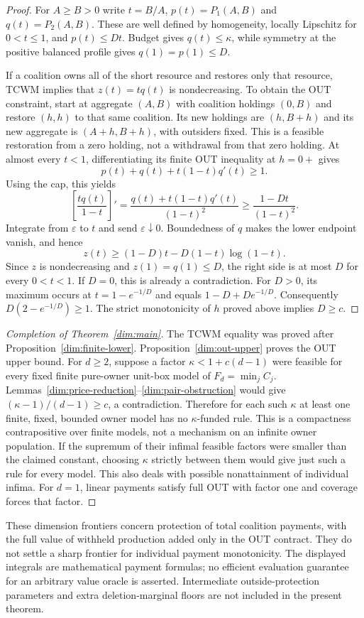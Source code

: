 \begin{proof}
For $A\ge B>0$ write $t=B/A$, $p(t)=P_1(A,B)$ and $q(t)=P_2(A,B)$.
These are well defined by homogeneity, locally Lipschitz for $0<t\le1$,
and $p(t)\le Dt$. Budget gives $q(t)\le\kappa$, while symmetry at the
positive balanced profile gives $q(1)=p(1)\le D$.

If a coalition owns all of the short resource and restores only that
resource, TCWM implies that $z(t)=tq(t)$ is nondecreasing. To obtain the
OUT constraint, start at aggregate $(A,B)$ with coalition holdings
$(0,B)$ and restore $(h,h)$ to that same coalition. Its new holdings are
$(h,B+h)$ and its new aggregate is $(A+h,B+h)$, with outsiders fixed.
This is a feasible restoration from a zero holding, not a withdrawal
from that zero holding. At almost every $t<1$, differentiating its finite
OUT inequality at $h=0+$ gives
\[
 p(t)+q(t)+t(1-t)q'(t)\ge1.
\]
Using the cap, this yields
\[
 \left[\frac{tq(t)}{1-t}\right]'
 =\frac{q(t)+t(1-t)q'(t)}{(1-t)^2}
 \ge\frac{1-Dt}{(1-t)^2}.
\]
Integrate from $\varepsilon$ to $t$ and send $\varepsilon\downarrow0$.
Boundedness of $q$ makes the lower endpoint vanish, and hence
\[
 z(t)\ge (1-D)t-D(1-t)\log(1-t).
\]
Since $z$ is nondecreasing and $z(1)=q(1)\le D$, the right side is at
most $D$ for every $0<t<1$. If $D=0$, this is already a contradiction.
For $D>0$, its maximum occurs at $t=1-e^{-1/D}$ and equals
$1-D+De^{-1/D}$. Consequently
$D(2-e^{-1/D})\ge1$. The strict monotonicity of $h$ proved above implies
$D\ge c$.
\end{proof}

\begin{proof}[Completion of Theorem~\ref{dim:main}]
The TCWM equality was proved after Proposition~\ref{dim:finite-lower}.
Proposition~\ref{dim:out-upper} proves the OUT upper bound.
For $d\ge2$, suppose a factor $\kappa<1+c(d-1)$ were feasible for
every fixed finite pure-owner unit-box model of $F_d=\min_jC_j$.
Lemmas~\ref{dim:price-reduction}--\ref{dim:pair-obstruction} would give
$(\kappa-1)/(d-1)\ge c$, a contradiction. Therefore for each such
$\kappa$ at least one finite, fixed, bounded owner model has no
$\kappa$-funded rule. This is a compactness contrapositive over finite
models, not a mechanism on an infinite owner population.
If the supremum of their infimal feasible factors were smaller than the
claimed constant, choosing $\kappa$ strictly between them would give just
such a rule for every model. This also deals with possible nonattainment
of individual infima. For $d=1$, linear payments satisfy full OUT with
factor one and coverage forces that factor.
\end{proof}

\begin{remark}\label{dim:scope}
These dimension frontiers concern protection of total coalition payments,
with the full value of withheld production added only in the OUT contract.
They do not settle a sharp frontier for individual payment monotonicity.
The displayed integrals are mathematical payment formulas; no efficient
evaluation guarantee for an arbitrary value oracle is asserted. Intermediate
outside-protection parameters and extra deletion-marginal floors are not
included in the present theorem.
\end{remark}
